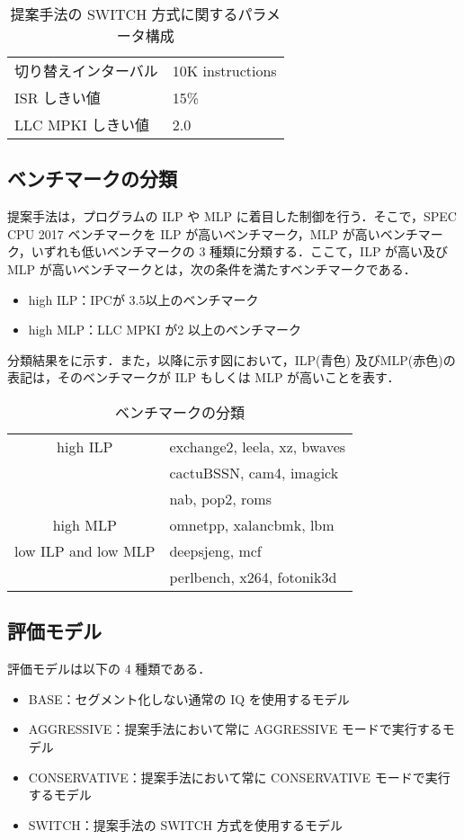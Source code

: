 \begin{table}[tb]
  \caption{提案手法の SWITCH 方式に関するパラメータ構成}
  \footnotesize
  \center
    \begin{tabular}{l|l} \hline \hline
    切り替えインターバル & 10K instructions \\
    ISR しきい値 & 15\% \\
    LLC MPKI しきい値 & 2.0 \\ \hline 
  \end{tabular}
  \label{tab:switch_config}
\end{table}

\subsection{ベンチマークの分類}
提案手法は，プログラムの ILP や MLP に着目した制御を行う．そこで，SPEC CPU 2017 ベンチマークを ILP が高いベンチマーク，MLP が高いベンチマーク，いずれも低いベンチマークの 3 種類に分類する．ここて，ILP が高い及びMLP が高いベンチマークとは，次の条件を満たすベンチマークである．
\begin{itemize}
  \item high ILP：IPCが 3.5以上のベンチマーク
  \item high MLP：LLC MPKI が2 以上のベンチマーク
\end{itemize}

分類結果をに示す．また，以降に示す図において，ILP(青色) 及びMLP(赤色)の表記は，そのベンチマークが ILP もしくは MLP が高いことを表す．
\begin{table}[htb]
  \caption{ベンチマークの分類}
  \footnotesize
  \center
    \begin{tabular}{c|l} \hline \hline
    high ILP & exchange2, leela, xz, bwaves\\
             & cactuBSSN, cam4, imagick\\
             & nab, pop2, roms\\ \hline
    high MLP &  omnetpp, xalancbmk, lbm\\ \hline
    low ILP and low MLP & deepsjeng, mcf\\
                        & perlbench, x264, fotonik3d\\ \hline
  \end{tabular}
  \label{tab:classification}
\end{table}

\subsection{評価モデル}
評価モデルは以下の 4 種類である．
\begin{itemize}
  \item BASE：セグメント化しない通常の IQ を使用するモデル
  \item AGGRESSIVE：提案手法において常に AGGRESSIVE モードで実行するモデル
  \item CONSERVATIVE：提案手法において常に CONSERVATIVE モードで実行するモデル
  \item SWITCH：提案手法の SWITCH 方式を使用するモデル 
\end{itemize}

